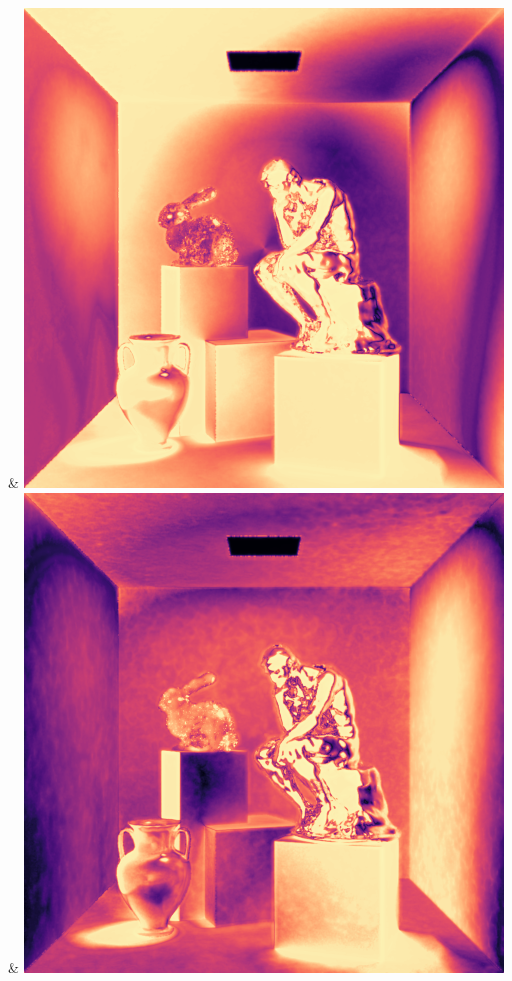 & \includegraphics[width=\linewidth]{figures/py/tests/batch_size/5+nrc+pt+14_1spp_flip.png}
& \includegraphics[width=\linewidth]{figures/py/tests/batch_size/25+nrc+pt+14_1spp_flip.png}

